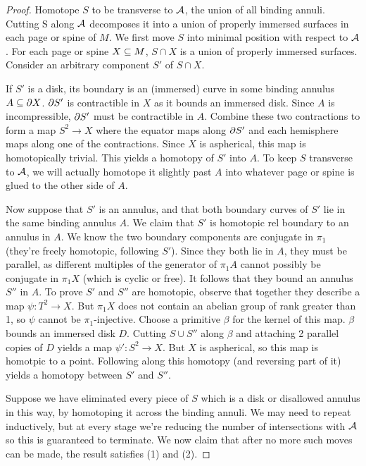 \begin{proof}

Homotope $S$ to be transverse to $\mathcal{A}$, the union of all binding annuli.
Cutting S along $\mathcal{A}$ decomposes it into a union of properly immersed surfaces
in each page or spine of $M$. We first move $S$ into minimal position with
respect to $\mathcal{A}$.  For each page or spine $X \subseteq M$, $S \cap X$ is a union of
properly immersed surfaces. Consider an arbitrary component $S'$ of $S \cap X$.

If $S'$ is a disk, its boundary is an (immersed) curve in some binding annulus
$A \subseteq \partial X$. $\partial S'$ is contractible in $X$ as it bounds an immersed disk.
Since $A$ is incompressible, $\partial S'$ must be contractible in $A$. Combine
these two contractions to form a map $S^2 \to X$ where the equator maps along
$\partial S'$ and each hemisphere maps along one of the contractions. Since $X$ is
aspherical, this map is homotopically trivial. This yields a homotopy of $S'$
into $A$.  To keep $S$ transverse to $\mathcal{A}$, we will actually homotope it
slightly past $A$ into whatever page or spine is glued to the other side of
$A$.

Now suppose that $S'$ is an annulus, and that both boundary curves of $S'$ lie
in the same binding annulus $A$. We claim that $S'$ is homotopic rel boundary
to an annulus in $A$. We know the two boundary components are conjugate in
$\pi_1$ (they're freely homotopic, following $S'$). Since they both lie in $A$,
they must be parallel, as different multiples of the generator of $\pi_1A$
cannot possibly be conjugate in $\pi_1X$ (which is cyclic or free). It follows
that they bound an annulus $S''$ in $A$.  To prove $S'$ and $S''$ are
homotopic, observe that together they describe a map $\psi\colon T^2 \to X$.
But $\pi_1X$ does not contain an abelian group of rank greater than 1, so
$\psi$ cannot be $\pi_1$-injective.  Choose a primitive $\beta$ for the kernel
of this map. $\beta$ bounds an immersed disk $D$.  Cutting $S \cup S''$ along
$\beta$ and attaching 2 parallel copies of $D$ yields a map $\psi'\colon S^2
\to X$.  But $X$ is aspherical, so this map is homotpic to a point. Following
along this homotopy (and reversing part of it) yields a homotopy between $S'$
and $S''$.

Suppose we have eliminated every piece of $S$ which is a disk or disallowed
annulus in this way, by homotoping it across the binding annuli. We may need to
repeat inductively, but at every stage we're reducing the number of
intersections with $\mathcal{A}$ so this is guaranteed to terminate. We now claim that
after no more such moves can be made, the result satisfies (1) and (2).


\end{proof}

